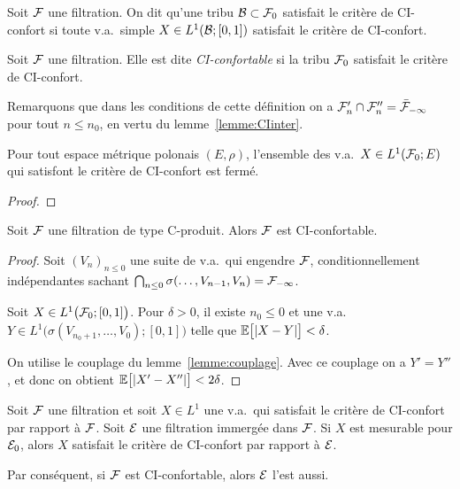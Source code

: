 \documentclass[12pt,a4paper]{article}
\begin{document}
\begin{definition}
Soit $\mathcal{F}$ une filtration. On dit qu'une tribu $\mathcal{B} \subset \mathcal{F}_0$ 
satisfait le critère de CI-confort si 
 toute v.a.\ simple $X \in L^1(\mathcal{B}; [0,1])$  satisfait le critère de CI-confort. 
\end{definition}

\begin{definition}
Soit $\mathcal{F}$ une filtration. Elle est dite \emph{CI-confortable} si 
la tribu $\mathcal{F}_0$  satisfait le critère de CI-confort. 
\end{definition}

Remarquons que dans les conditions de cette définition on 
a $\mathcal{F}'_{n}\cap\mathcal{F}''_{n} = \bar{\mathcal{F}}_{-\infty}$ pour tout $n \leq n_0$, en vertu du lemme~\ref{lemme:CIinter}.

\begin{ppsition}\label{ppsition:CIferme}
Pour tout espace métrique polonais $(E,\rho)$, 
l'ensemble des v.a.\ $X \in L^1(\mathcal{F}_0; E)$ qui satisfont le critère de CI-confort est fermé. 
\end{ppsition}

\begin{proof}

\end{proof}

\begin{ppsition}
Soit $\mathcal{F}$ une filtration de type C-produit. Alors $\mathcal{F}$ est CI-confortable.
\end{ppsition}

\begin{proof}
Soit ${(V_n)}_{n \leq 0}$ une suite de v.a.\ qui engendre $\mathcal{F}$, 
 conditionnellement indépendantes 
sachant $\bigcap_{n \leq 0}\sigma(\ldots, V_{n-1}, V_n) = \mathcal{F}_{-\infty}$. 

Soit $X \in L^1\bigl(\mathcal{F}_0; [0,1]\bigr)$. Pour $\delta>0$, il existe 
$n_0 \leq 0$ et une v.a.\ $Y \in L^1\bigl(\sigma(V_{n_0+1},\ldots, V_0); [0,1]\bigr)$ 
telle que $\mathbb{E}\bigl[|X-Y|\bigr] < \delta$. 
 
On utilise le couplage du lemme~\ref{lemme:couplage}. 
Avec ce couplage on a $Y'=Y''$, et donc on obtient 
$\mathbb{E}\bigl[|X'-X''|\bigr] < 2\delta$. 
\end{proof}


\begin{ppsition}
Soit $\mathcal{F}$ une filtration et soit $X \in L^1$ une v.a.\ qui satisfait le critère de 
CI-confort par rapport à $\mathcal{F}$. 
Soit $\mathcal{E}$ une filtration immergée dans $\mathcal{F}$. Si $X$ est mesurable pour 
$\mathcal{E}_0$, alors $X$ satisfait le critère de CI-confort par rapport à $\mathcal{E}$. 

Par conséquent, si $\mathcal{F}$ est CI-confortable, alors $\mathcal{E}$ l'est aussi. 
\end{ppsition}
\end{document}
